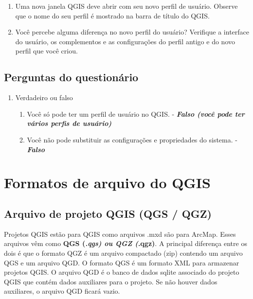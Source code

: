 \documentclass[
  portuguese,
]{krantz}
\providecommand{\tightlist}{%
  \setlength{\itemsep}{0pt}\setlength{\parskip}{0pt}}
\begin{document}
\begin{enumerate}
\def\labelenumi{\arabic{enumi}.}
\setcounter{enumi}{2}
\item
  Uma nova janela QGIS deve abrir com seu novo perfil de usuário. Observe que o nome do seu perfil é mostrado na barra de título do QGIS.
\item
  Você percebe alguma diferença no novo perfil do usuário? Verifique a interface do usuário, os complementos e as configurações do perfil antigo e do novo perfil que você criou.
\end{enumerate}

\hypertarget{perguntas-do-questionuxe1rio-3}{%
\subsection{\texorpdfstring{\textbf{Perguntas do questionário}}{Perguntas do questionário}}\label{perguntas-do-questionuxe1rio-3}}

\begin{enumerate}
\def\labelenumi{\arabic{enumi}.}
\tightlist
\item
  Verdadeiro ou falso

  \begin{enumerate}
  \def\labelenumii{\arabic{enumii}.}
  \tightlist
  \item
    Você só pode ter um perfil de usuário no QGIS. - \textbf{\emph{Falso (você pode ter vários perfis de usuário)}}
  \item
    Você não pode substituir as configurações e propriedades do sistema. - \textbf{\emph{Falso}}
  \end{enumerate}
\end{enumerate}

\hypertarget{formatos-de-arquivo-do-qgis}{%
\section{Formatos de arquivo do QGIS}\label{formatos-de-arquivo-do-qgis}}

\hypertarget{arquivo-de-projeto-qgis-qgs-qgz}{%
\subsection{\texorpdfstring{\textbf{Arquivo de projeto QGIS (QGS / QGZ)}}{Arquivo de projeto QGIS (QGS / QGZ)}}\label{arquivo-de-projeto-qgis-qgs-qgz}}

Projetos QGIS estão para QGIS como arquivos .mxd são para ArcMap. Esses arquivos vêm como \textbf{QGS (\emph{.qgs)\textbf{ ou }QGZ (}.qgz)}. A principal diferença entre os dois é que o formato QGZ é um arquivo compactado (zip) contendo um arquivo QGS e um arquivo QGD. O formato QGS é um formato XML para armazenar projetos QGIS. O arquivo QGD é o banco de dados sqlite associado do projeto QGIS que contém dados auxiliares para o projeto. Se não houver dados auxiliares, o arquivo QGD ficará vazio.
\end{document}
